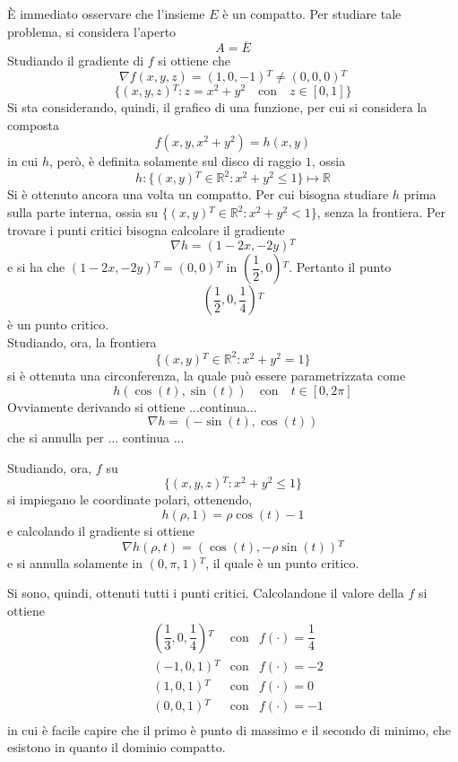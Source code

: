 \documentclass[a4paper]{extarticle}
\begin{document}
\vspace{2em}
\noindent
È immediato osservare che l'insieme $E$ è un compatto. Per studiare tale problema, si considera l'aperto
\[A=\overline{E}\]
Studiando il gradiente di $f$ si ottiene che
\[\nabla f(x,y,z) = (1,0,-1){^T} \neq (0,0,0){^T}\]
\[\{(x,y,z){^T} : z = x^2+y^2 \hspace{1em} \text{con} \hspace{1em} z \in [0,1]\}\]
Si sta considerando, quindi, il grafico di una funzione, per cui si considera la composta
\[f(x,y,x^2+y^2) = h(x,y)\]
in cui $h$, però, è definita solamente sul disco di raggio $1$, ossia
\[h : \{(x,y){^T} \in \mathbb{R}^2 : x^2+y^2 \leq 1\} \longmapsto \mathbb{R}\]
Si è ottenuto ancora una volta un compatto. Per cui bisogna studiare $h$ prima sulla parte interna, ossia su $\{(x,y){^T} \in \mathbb{R}^2 : x^2+y^2 < 1\}$, senza la frontiera. Per trovare i punti critici bisogna calcolare il gradiente
\[\nabla h = (1-2x,-2y){^T}\]
e si ha che $(1-2x,-2y){^T} = (0,0){^T}$ in $\left(\dfrac{1}{2},0\right){^T}$. Pertanto il punto
\[\left(\dfrac{1}{2},0,\dfrac{1}{4}\right){^T}\]
è un punto critico.\\
Studiando, ora, la frontiera
\[\{(x,y){^T} \in \mathbb{R}^2 : x^2+y^2 = 1\}\]
si è ottenuta una circonferenza, la quale può essere parametrizzata come
\[h(\cos(t),\sin(t)) \hspace{1em} \text{con} \hspace{1em} t \in [0,2\pi]\]
Ovviamente derivando si ottiene ...continua...
\[\nabla h = (-\sin(t),\cos(t))\]
che si annulla per ... continua ...

\vspace{1em}
\noindent
Studiando, ora, $f$ su
\[\{(x,y,z){^T} : x^2 + y^2 \leq 1\}\]
si impiegano le coordinate polari, ottenendo,
\[h(\rho,1) = \rho \cos(t) - 1\]
e calcolando il gradiente si ottiene
\[\nabla h(\rho,t) = (\cos(t), - \rho \sin(t)){^T}\]
e si annulla solamente in $(0,\pi,1){^T}$, il quale è un punto critico.

\vspace{1em}
\noindent
Si sono, quindi, ottenuti tutti i punti critici. Calcolandone il valore della $f$ si ottiene
\begin{align*}
    &\left(\dfrac{1}{3},0,\dfrac{1}{4}\right){^T} & \text{con} & f(\cdot) = \dfrac{1}{4}\\
    &\left(-1,0,1\right){^T} & \text{con} & f(\cdot) = -2\\
    &\left(1,0,1\right){^T} & \text{con} & f(\cdot) = 0\\
    &\left(0,0,1\right){^T} & \text{con} & f(\cdot) = -1\\
\end{align*}
in cui è facile capire che il primo è punto di massimo e il secondo di minimo, che esistono in quanto il dominio compatto.
\end{document}
